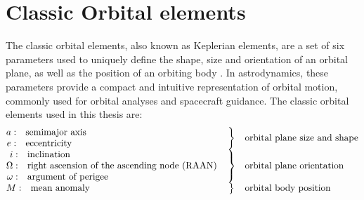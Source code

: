 

\section{Classic Orbital elements}
The classic orbital elements, also known as Keplerian elements, are a set of six parameters used to uniquely define the shape, size and orientation of an orbital plane, as well as the position of an orbiting body \cite{curtis2005orbital, vallado2001fundamentals}. In astrodynamics, these parameters provide a compact and intuitive representation of orbital motion, commonly used for orbital analyses and spacecraft guidance. The classic orbital elements used in this thesis are:
\[
\begin{array}{@{}l@{\quad}c@{\quad}l@{}}

\begin{array}{@{}r@{\;}l@{\quad}l@{}}
a      &: & \text{semimajor axis}\\
e      &: & \text{eccentricity}
\end{array}
&
\left.\vphantom{\begin{array}{c}x\\x\end{array}}\right\}
&
\text{orbital plane size and shape}
\\
\begin{array}{@{}r@{\;}l@{\quad}l@{}}
i      &: & \text{inclination}\\
\Omega &: & \text{right ascension of the ascending node (RAAN)}\\
\omega &: & \text{argument of perigee}
\end{array}
&
\left.\vphantom{\begin{array}{c}x\\x\\x\end{array}}\right\}
&
\text{orbital plane orientation}
\\[1em]
\begin{array}{@{}r@{\;}l@{\quad}l@{}}
M      &: & \text{mean anomaly}
\end{array}
&
\left.\vphantom{\begin{array}{c}x\end{array}}\right\}
&
\text{orbital body position}

\end{array}
\]
